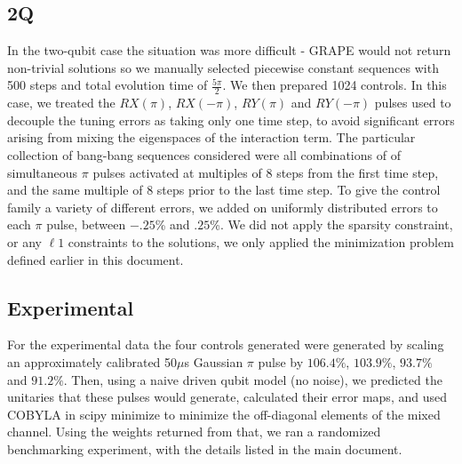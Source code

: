 \documentclass[aps,nofootinbib,pra,notitlepage,twocolumn]{revtex4-1}
\begin{document}
\subsection{2Q}
In the two-qubit case the situation was more difficult - GRAPE would not return non-trivial solutions so we manually selected piecewise constant sequences with 500 steps and total evolution time of $\frac{5\pi}{2}$. We then prepared 1024 controls.  In this case, we treated the $RX(\pi)$, $RX(-\pi)$, $RY(\pi)$ and $RY(-\pi)$ pulses used to decouple the tuning errors as taking only one time step, to avoid significant errors arising from mixing the eigenspaces of the interaction term. The particular collection of bang-bang sequences considered were all combinations of of simultaneous $\pi$ pulses activated at multiples of $8$ steps from the first time step, and the same multiple of $8$ steps prior to the last time step. To give the control family a variety of different errors, we added on uniformly distributed errors to each $\pi$ pulse, between $-.25$\% and $.25$\%. We did not apply the sparsity constraint, or any $\ell 1$ constraints to the solutions, we only applied the minimization problem defined earlier in this document.
\subsection{Experimental}
For the experimental data the four controls generated were generated by scaling an approximately calibrated 50$\mu$s Gaussian $\pi$ pulse by $106.4\%$,  $103.9\%$, $93.7\%$ and $91.2\%$. Then, using a naive driven qubit model (no noise), we predicted the unitaries that these pulses would generate, calculated their error maps, and used COBYLA in scipy minimize to minimize the off-diagonal elements of the mixed channel. Using the weights returned from that, we ran a randomized benchmarking experiment, with the details listed in the main document.
\end{document}
